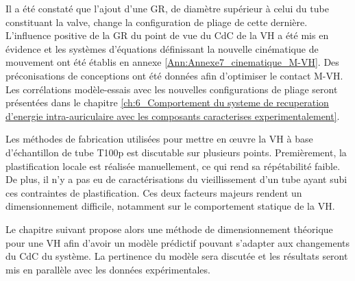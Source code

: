 Il a été constaté que l'ajout d'une GR, de diamètre supérieur à celui du tube constituant la valve, change la configuration de pliage de cette dernière. L'influence positive de la GR du point de vue du CdC de la VH a été mis en évidence et les systèmes d'équations définissant la nouvelle cinématique de mouvement ont été établis en annexe \ref{Ann:Annexe7_cinematique_M-VH}. Des préconisations de conceptions ont été données afin d'optimiser le contact M-VH. Les corrélations modèle-essais avec les nouvelles configurations de pliage seront présentées dans le chapitre \ref{ch:6_Comportement du systeme de recuperation d’energie intra-auriculaire avec les composants caracterises experimentalement}.
	
Les méthodes de fabrication utilisées pour mettre en \oe{}uvre la VH à base d'échantillon de tube T100p est discutable sur plusieurs points. Premièrement, la plastification locale est réalisée manuellement, ce qui rend sa répétabilité faible. De plus, il n'y a pas eu de caractérisations du vieillissement d'un tube ayant subi ces contraintes de plastification. Ces deux facteurs majeurs rendent un dimensionnement difficile, notamment sur le comportement statique de la VH.

Le chapitre suivant propose alors une méthode de dimensionnement théorique pour une VH afin d'avoir un modèle prédictif pouvant s'adapter aux changements du CdC du système. La pertinence du modèle sera discutée et les résultats seront mis en parallèle avec les données expérimentales.



